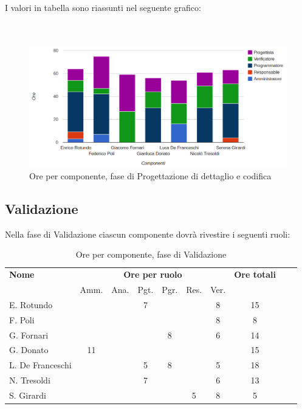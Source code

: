 I valori in tabella sono riassunti nel seguente grafico: \\ \\ \\

\begin{figure}[H]
\centering
\includegraphics[scale=0.35]{4-3.png}
\caption{Ore per componente, fase di Progettazione di dettaglio e codifica \label{fig:nome}}
\end{figure}

\pagebreak
\subsection{Validazione}

Nella fase di Validazione ciascun componente dovrà rivestire i seguenti ruoli:

\begin{table}[H]
\centering
\begin{tabular}{lccccccccc}
\toprule 
    \textbf{Nome}  & \multicolumn{6}{c}{\textbf{Ore per ruolo}} & \textbf{Ore totali}\\
    & Amm. & Ana. & Pgt. & Pgr. & Res. & Ver. \\
    \midrule
    E. Rotundo   	&   &  &	 7	&   &   & 8 & 15 \\
    F. Poli  		& 	&  &	 	&   &   & 8 & 8  \\
    G. Fornari		& 	&  &	 	& 8 &   & 6 & 14 \\
    G. Donato 		& 11	&  &	 	&   &   &   & 15 \\
    L. De Franceschi 	& 	&  &	 5	& 8 &   & 5 & 18 \\
    N. Tresoldi 		& 	&  &	 7	&   &   & 6 & 13 \\
    S. Girardi 		& 	&  &	 	&   & 5 & 8 & 5  \\
    
    \bottomrule
\end{tabular}
\caption{Ore per componente, fase di Validazione}
\end{table}

